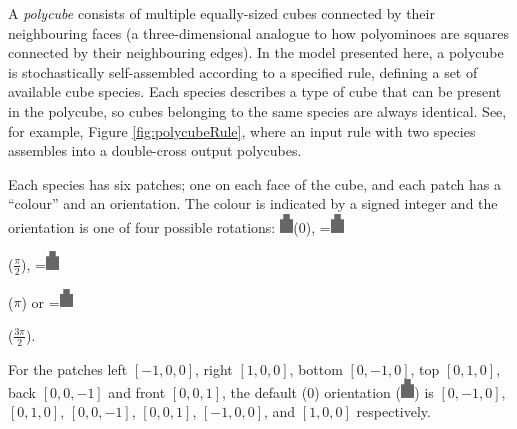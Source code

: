 A \emph{polycube} consists of multiple equally-sized cubes connected by their neighbouring faces (a three-dimensional analogue to how polyominoes are squares connected by their neighbouring edges). In the model presented here, a polycube is stochastically self-assembled according to a specified rule, defining a set of available cube species. Each species describes a type of cube that can be present in the polycube, so cubes belonging to the same species are always identical. See, for example, Figure \ref{fig:polycubeRule}, where an input rule with two species assembles into a double-cross output polycubes.

Each species has six patches; one on each face of the cube, and each patch has a ``colour'' and an orientation. The colour is indicated by a signed integer and the orientation is one of four possible rotations: \includegraphics[width=10pt]{figures/face.eps}\hspace{4pt}(\(0\)),
\begingroup{}=\hbox{\includegraphics[width=10pt,angle=-90]{figures/face.eps}}\parbox{\wd0}{}\endgroup\hspace{4pt}(\(\frac{\pi}{2}\)),
\begingroup{}=\hbox{\includegraphics[width=10pt,angle=180]{figures/face.eps}}\parbox{\wd0}{}\endgroup\hspace{4pt}(\(\pi\)) or
\begingroup{}=\hbox{\includegraphics[width=10pt,angle=90]{figures/face.eps}}\parbox{\wd0}{}\endgroup\hspace{4pt}(\(\frac{3\pi}{2}\)).

For the patches left \(\left[-1, 0, 0\right]\), right \(\left[1, 0, 0\right]\), bottom \(\left[0, -1, 0\right]\), top \(\left[0, 1, 0\right]\), back \(\left[0, 0, -1\right]\) and front \(\left[0, 0, 1\right]\), the default (\(0\)) orientation (\includegraphics[width=10pt]{figures/face.eps}) is \(\left[0, -1, 0\right]\), \(\left[0, 1, 0\right]\), \(\left[0, 0, -1\right]\), \(\left[0, 0, 1\right]\), \(\left[-1, 0, 0\right]\), and \(\left[1, 0, 0\right]\) respectively.

